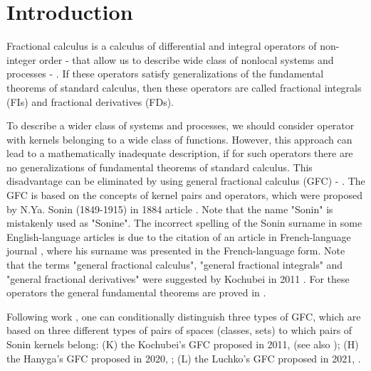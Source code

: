 \documentclass[12pt]{article}
\begin{document}
\newpage


\section{Introduction}

Fractional calculus is a calculus of differential and integral operators of non-integer order \cite{SKM} - \cite{Handbook2019-2} 
that allow us to describe wide class of nonlocal systems and processes \cite{Handbook2019-4} - \cite{BOOK-DG-2021}.
If these operators satisfy generalizations of the fundamental theorems of standard calculus, then these operators are called fractional integrals (FIs) and fractional derivatives (FDs).


To describe a wider class of systems and processes, we should consider operator with kernels belonging to a wide class of functions. 
However, this approach can lead to a mathematically inadequate description, if for such operators there are no generalizations of fundamental theorems of standard calculus.
This disadvantage can be eliminated by using general fractional calculus (GFC) \cite{Luchko2021-1} - \cite{Bazhlekova2021}. 
The GFC is based on the concepts of kernel pairs and operators, which were proposed by N.Ya. Sonin (1849-1915) in 1884 article \cite{Sonin-1,Sonin-2}. 
Note that the name "Sonin" \cite{Sonin-MathNet,Sonin-Wikipedia} is mistakenly used as "Sonine". 
The incorrect spelling of the Sonin surname in some English-language articles is due to the citation of an article in French-language journal \cite{Sonin-1}, where his surname was presented in the French-language form.
Note that the terms "general fractional calculus", "general fractional integrals" and "general fractional derivatives" were suggested by Kochubei in 2011 \cite{Kochubei2011}. 
For these operators the general fundamental theorems are proved in \cite{Kochubei2011,Hanyga,Luchko2021-1}. 

Following work \cite{Luchko2021-1}, one can conditionally distinguish three types of GFC, which are based on 
three different types of pairs of spaces (classes, sets) to which pairs of Sonin kernels belong: 
({\cal K}) the Kochubei's GFC proposed in 2011, \cite{Kochubei2011} (see also \cite{Kochubei2019-1,Kochubei2019-2});
({\cal H}) the Hanyga's GFC proposed in 2020, \cite{Hanyga};
({\cal L}) the Luchko's GFC proposed in 2021, \cite{Luchko2021-1}.
\end{document}
